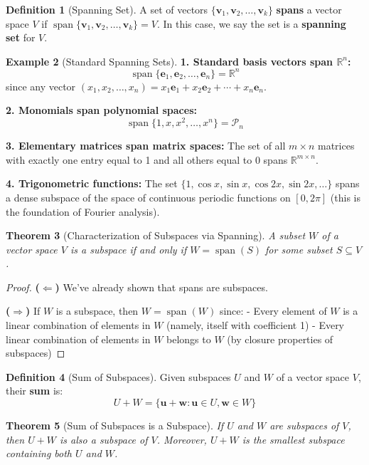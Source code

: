 \documentclass[12pt]{article}
\numberwithin{equation}{section}
\newcommand{\vect}[1]{\boldsymbol{#1}}   %
\newcommand{\Span}{\operatorname{span}}
\theoremstyle{plain}
\newtheorem{theorem}{Theorem}[section]
\theoremstyle{definition}
\newtheorem{definition}[theorem]{Definition}
\newtheorem{example}[theorem]{Example}
\theoremstyle{remark}
\begin{document}
\begin{definition}[Spanning Set]
A set of vectors $\{\vect{v}_1, \vect{v}_2, \ldots, \vect{v}_k\}$ \textbf{spans} a vector space $V$ if $\Span\{\vect{v}_1, \vect{v}_2, \ldots, \vect{v}_k\} = V$. In this case, we say the set is a \textbf{spanning set} for $V$.
\end{definition}

\begin{example}[Standard Spanning Sets]
\textbf{1. Standard basis vectors span $\mathbb{R}^n$:}
$$\Span\{\vect{e}_1, \vect{e}_2, \ldots, \vect{e}_n\} = \mathbb{R}^n$$
since any vector $(x_1, x_2, \ldots, x_n) = x_1\vect{e}_1 + x_2\vect{e}_2 + \cdots + x_n\vect{e}_n$.

\textbf{2. Monomials span polynomial spaces:}
$$\Span\{1, x, x^2, \ldots, x^n\} = \mathcal{P}_n$$

\textbf{3. Elementary matrices span matrix spaces:}
The set of all $m \times n$ matrices with exactly one entry equal to 1 and all others equal to 0 spans $\mathbb{R}^{m \times n}$.

\textbf{4. Trigonometric functions:}
The set $\{1, \cos x, \sin x, \cos 2x, \sin 2x, \ldots\}$ spans a dense subspace of the space of continuous periodic functions on $[0, 2\pi]$ (this is the foundation of Fourier analysis).
\end{example}

\begin{theorem}[Characterization of Subspaces via Spanning]
A subset $W$ of a vector space $V$ is a subspace if and only if $W = \Span(S)$ for some subset $S \subseteq V$.
\end{theorem}

\begin{proof}
\textbf{($\Leftarrow$)} We've already shown that spans are subspaces.

\textbf{($\Rightarrow$)} If $W$ is a subspace, then $W = \Span(W)$ since:
- Every element of $W$ is a linear combination of elements in $W$ (namely, itself with coefficient 1)
- Every linear combination of elements in $W$ belongs to $W$ (by closure properties of subspaces)
\end{proof}

\begin{definition}[Sum of Subspaces]
Given subspaces $U$ and $W$ of a vector space $V$, their \textbf{sum} is:
$$U + W = \{\vect{u} + \vect{w} : \vect{u} \in U, \vect{w} \in W\}$$
\end{definition}

\begin{theorem}[Sum of Subspaces is a Subspace]
If $U$ and $W$ are subspaces of $V$, then $U + W$ is also a subspace of $V$. Moreover, $U + W$ is the smallest subspace containing both $U$ and $W$.
\end{theorem}
\end{document}
